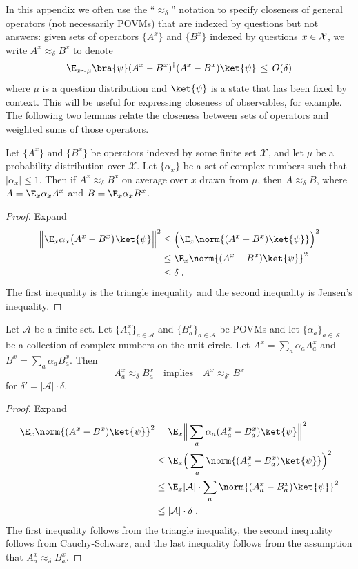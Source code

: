 In this appendix we often use the ``$\approx_\delta$'' notation to specify closeness of general operators (not necessarily POVMs) that are indexed by questions but not answers: given sets of operators $\{A^x \}$ and $\{B^x\}$ indexed by questions $x \in \cal{X}$, we write $A^x \approx_\delta B^x$ to denote \[
	\E_{x \sim \mu} \bra{\psi} (A^x - B^x)^\dagger (A^x - B^x)
        \ket{\psi}\,\leq\, O(\delta)
      \]
where $\mu$ is a question distribution and $\ket{\psi}$ is a state that has been fixed by context. This will be useful for expressing closeness of observables, for example. The following two lemmas relate the closeness between sets of operators and weighted sums of those operators. 
\begin{lemma}
\label{lem:avg-closeness}
Let $\{A^x \}$ and $\{B^x\}$ be operators indexed by some finite set $\mathcal{X}$, and let $\mu$ be a probability distribution over $\mathcal{X}$. Let $\{\alpha_x \}$ be a set of complex numbers such that $|\alpha_x| \leq 1$. Then if $A^x \approx_\delta B^x$ on average over $x$ drawn from $\mu$, then $A \approx_\delta B$, where $A = \E_x \alpha_x A^x$ and $B= \E_x \alpha_x B^x$.
\end{lemma}
\begin{proof}
Expand
\begin{align*}
	\Big\| \E_x \alpha_x \big ( A^x - B^x \big) \ket{\psi} \Big\|^2 &\leq \Big( \E_x \norm{ (A^x -B^x) \ket{\psi}} \Big)^2 \\
	&\leq \E_x \norm{(A^x - B^x) \ket{\psi}}^2 \\
	&\leq \delta\;.
\end{align*}
The first inequality is the triangle inequality and the second inequality is Jensen's inequality. 
\end{proof}

\begin{lemma}
\label{lem:povm-to-obs}
Let $\mathcal{A}$ be a finite set. Let $\{A^x_a \}_{a \in \mathcal{A}}$ and $\{B^x_a\}_{a \in \mathcal{A}}$ be POVMs and let $\{ \alpha_a \}_{a \in \mathcal{A}}$ be a collection of complex numbers on the unit circle. Let $A^x = \sum_a \alpha_a A^x_a$ and $B^x = \sum_a  \alpha_a B^x_a$. Then 
\[
	A^x_a \approx_\delta B^x_a \quad \text{implies} \quad A^x \approx_{\delta'} B^x
\]
for $\delta' = |\mathcal{A}| \cdot \delta$.
\end{lemma}
\begin{proof}
Expand
	\begin{align*}
		\E_x \norm{(A^x - B^x) \ket{\psi}}^2 &= \E_x \Big\|\sum_a \alpha_a (A^x_a - B^x_a) \ket{\psi}\Big\|^2 \\
		&\leq \E_x \Big( \sum_a \norm{ (A^x_a - B^x_a) \ket{\psi}} \Big)^2 \\
		&\leq \E_x |\mathcal{A}| \cdot \sum_a \norm{ (A^x_a - B^x_a) \ket{\psi}}^2 \\
		&\leq |\mathcal{A}| \cdot \delta\;.
	\end{align*}
The first inequality follows from the triangle inequality, the second inequality follows from Cauchy-Schwarz, and the last inequality follows from the assumption that $A^x_a \approx_\delta B^x_a$. 
\end{proof}


